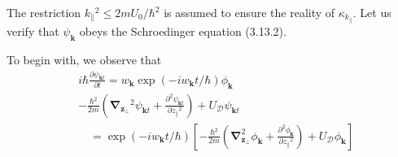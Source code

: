 \documentclass{article}
\begin{document}
The restriction $k_{\|}{ }^{2} \leq 2 m U_{0} / \hbar^{2}$ is assumed to ensure the reality of $\kappa_{k_{\|}}$. Let us verify that $\psi_{\boldsymbol{k}}$ obeys the Schroedinger equation (3.13.2).

To begin with, we observe that
$$
\begin{align*}
& i \hbar \frac{\partial \psi_{\boldsymbol{k} t}}{\partial t}=w_{\boldsymbol{k}} \exp \left(-i w_{\boldsymbol{k}} t / \hbar\right) \phi_{\boldsymbol{k}}  \tag{3.13.11}\\
& -\frac{\hbar^{2}}{2 m}\left(\boldsymbol{\nabla}_{\boldsymbol{z}_{\perp}}{ }^{2} \psi_{\boldsymbol{k} t}+\frac{\partial^{2} \psi_{\boldsymbol{k} t}}{\partial z_{\|}{ }^{2}}\right)+U_{\mathcal{D}} \psi_{\boldsymbol{k} t}  \tag{3.13.12}\\
& \quad=\exp \left(-i w_{\boldsymbol{k}} t / \hbar\right)\left[-\frac{\hbar^{2}}{2 m}\left(\boldsymbol{\nabla}_{\boldsymbol{z}_{\perp}}^{2} \phi_{\boldsymbol{k}}+\frac{\partial^{2} \phi_{\boldsymbol{k}}}{\partial z_{\|}{ }^{2}}\right)+U_{\mathcal{D}} \phi_{\boldsymbol{k}}\right]
\end{align*}
$$
\end{document}
